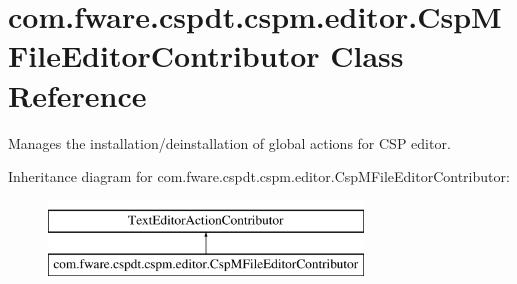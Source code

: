 \hypertarget{classcom_1_1fware_1_1cspdt_1_1cspm_1_1editor_1_1_csp_m_file_editor_contributor}{}\section{com.\+fware.\+cspdt.\+cspm.\+editor.\+Csp\+M\+File\+Editor\+Contributor Class Reference}
\label{classcom_1_1fware_1_1cspdt_1_1cspm_1_1editor_1_1_csp_m_file_editor_contributor}


Manages the installation/deinstallation of global actions for C\+SP editor.  


Inheritance diagram for com.\+fware.\+cspdt.\+cspm.\+editor.\+Csp\+M\+File\+Editor\+Contributor\+:\begin{figure}[H]
\begin{center}
\leavevmode
\includegraphics[height=2.000000cm]{classcom_1_1fware_1_1cspdt_1_1cspm_1_1editor_1_1_csp_m_file_editor_contributor}
\end{center}
\end{figure}
